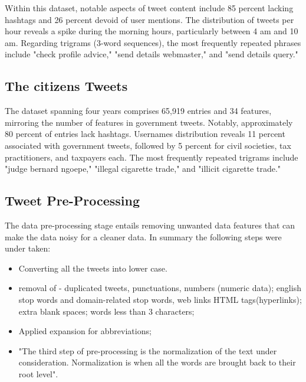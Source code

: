 Within this dataset, notable aspects of tweet content include 85 percent  lacking hashtags and 26 percent devoid of user mentions. The distribution of tweets per hour reveals a spike during the morning hours, particularly between 4 am and 10 am. Regarding trigrams (3-word sequences), the most frequently repeated phrases include "check profile advice," "send details webmaster," and "send details query."

\subsection{The citizens Tweets} 

The dataset spanning four years comprises 65,919 entries and 34 features, mirroring the number of features in government tweets. Notably, approximately 80 percent of entries lack hashtags. Usernames distribution reveals 11 percent associated with government tweets, followed by 5 percent for civil societies, tax practitioners, and taxpayers each. The most frequently repeated trigrams include "judge bernard ngoepe," "illegal cigarette trade," and "illicit cigarette trade."

\subsection{Tweet Pre-Processing}
The data pre-processing stage entails removing unwanted data features that can make the data noisy for a cleaner data.  In summary the following steps were under taken:

\begin{itemize}
    \item Converting all the tweets into lower case.
\end{itemize}

\begin{itemize}
    \item removal of - duplicated tweets, punctuations, numbers (numeric data); english stop words and domain-related stop words, web links HTML tags(hyperlinks); extra blank spaces; words less than 3 characters;
\end{itemize}

\begin{itemize}
    \item Applied expansion for abbreviations; 
\end{itemize}

\begin{itemize}
    \item "The third step of pre-processing is the normalization of the text under consideration. Normalization is when all the words are brought back to their root level".
\end{itemize}

